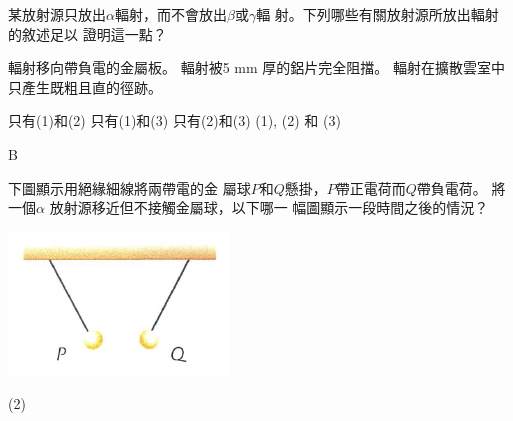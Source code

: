 {
    某放射源只放出$\alpha$輻射，而不會放出$\beta$或$\gamma$輻 射。下列哪些有關放射源所放出輻射的敘述足以 證明這一點？
    \begin{statements}
        \task 輻射移向帶負電的金屬板。
        \task 輻射被5 mm 厚的鋁片完全阻擋。
        \task 輻射在擴散雲室中只產生既粗且直的徑跡。
    \end{statements}
    \begin{tasks}
        \task 只有(1)和(2)
        \task 只有(1)和(3)
        \task 只有(2)和(3)
        \task (1), (2) 和 (3)
    \end{tasks}
}{B}

{
    下圖顯示用絕緣細線將兩帶電的金 屬球$P$和$Q$懸掛，$P$帶正電荷而$Q$帶負電荷。 將一個$\alpha$ 放射源移近但不接觸金屬球，以下哪一 幅圖顯示一段時間之後的情況？
    \par{\par\centering\includegraphics[width=.3\textwidth]{./img/ch1_prop_mc_2024-06-17-21-54-33.png}\par}
    \begin{tasks}(2)
        \task {}
        \task {}
        \task {}

\end{tasks}}
